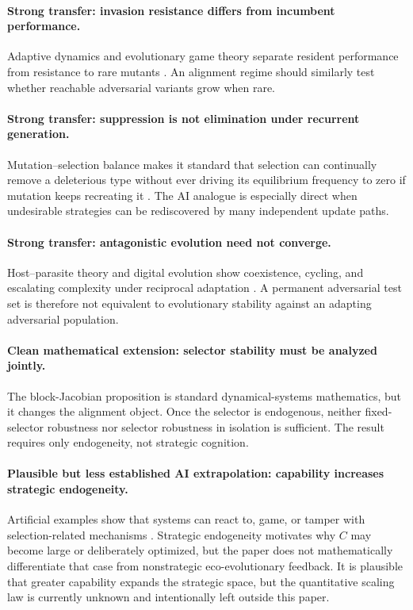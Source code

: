 \documentclass[11pt]{article}
\begin{document}
\paragraph{Strong transfer: invasion resistance differs from incumbent performance.}
Adaptive dynamics and evolutionary game theory separate resident performance from resistance to rare mutants \parencite{geritz1998}. An alignment regime should similarly test whether reachable adversarial variants grow when rare.

\paragraph{Strong transfer: suppression is not elimination under recurrent generation.}
Mutation--selection balance makes it standard that selection can continually remove a deleterious type without ever driving its equilibrium frequency to zero if mutation keeps recreating it \parencite{trotter2014}. The AI analogue is especially direct when undesirable strategies can be rediscovered by many independent update paths.

\paragraph{Strong transfer: antagonistic evolution need not converge.}
Host--parasite theory and digital evolution show coexistence, cycling, and escalating complexity under reciprocal adaptation \parencite{buckingham2022,papkou2019,zaman2014}. A permanent adversarial test set is therefore not equivalent to evolutionary stability against an adapting adversarial population.

\paragraph{Clean mathematical extension: selector stability must be analyzed jointly.}
The block-Jacobian proposition is standard dynamical-systems mathematics, but it changes the alignment object. Once the selector is endogenous, neither fixed-selector robustness nor selector robustness in isolation is sufficient. The result requires only endogeneity, not strategic cognition.

\paragraph{Plausible but less established AI extrapolation: capability increases strategic endogeneity.}
Artificial examples show that systems can react to, game, or tamper with selection-related mechanisms \parencite{hardt2016,perdomo2020,everitt2019,greenblatt2024}. Strategic endogeneity motivates why $C$ may become large or deliberately optimized, but the paper does not mathematically differentiate that case from nonstrategic eco-evolutionary feedback. 
It is plausible that greater capability expands the strategic space, but the quantitative scaling law is currently unknown and intentionally left outside this paper.
\end{document}
